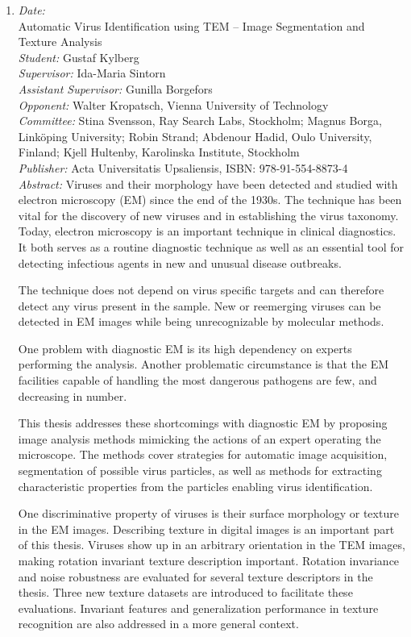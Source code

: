 {\begin{enumerate}
\item
{\em Date:} ~\\
{\bf }Automatic Virus Identification using TEM -- Image Segmentation and Texture Analysis~\\
{\em Student:} Gustaf Kylberg~\\
{\em Supervisor:} Ida-Maria Sintorn ~\\
{\em Assistant Supervisor:} Gunilla Borgefors~\\
{\em Opponent:} Walter Kropatsch, Vienna University of Technology~\\
{\em Committee:}  Stina Svensson, Ray Search Labs, Stockholm; Magnus Borga, Link\"{o}ping University; Robin Strand; Abdenour Hadid, Oulo University, Finland; Kjell Hultenby, Karolinska Institute, Stockholm~\\
{\em Publisher:} Acta Universitatis Upsaliensis, ISBN: 978-91-554-8873-4~\\ 
{\em Abstract:} Viruses and their morphology have been detected and studied with electron microscopy (EM) since the end of the 1930s. The technique has been vital for the discovery of new viruses and in establishing the virus taxonomy. Today, electron microscopy is an important technique in clinical diagnostics. It both serves as a routine diagnostic technique as well as an essential tool for detecting infectious agents in new and unusual disease outbreaks.

The technique does not depend on virus specific targets and can therefore detect any virus present in the sample. New or reemerging viruses can be detected in EM images while being unrecognizable by molecular methods.

One problem with diagnostic EM is its high dependency on experts performing the analysis. Another problematic circumstance is that the EM facilities capable of handling the most dangerous pathogens are few, and decreasing in number.

This thesis addresses these shortcomings with diagnostic EM by proposing image analysis methods mimicking the actions of an expert operating the microscope. The methods cover strategies for automatic image acquisition, segmentation of possible virus particles, as well as methods for extracting characteristic properties from the particles enabling virus identification.

One discriminative property of viruses is their surface morphology or texture in the EM images. Describing texture in digital images is an important part of this thesis. Viruses show up in an arbitrary orientation in the TEM images, making rotation invariant texture description important. Rotation invariance and noise robustness are evaluated for several texture descriptors in the thesis. Three new texture datasets are introduced to facilitate these evaluations. Invariant features and generalization performance in texture recognition are also addressed in a more general context.


\end{enumerate}}
